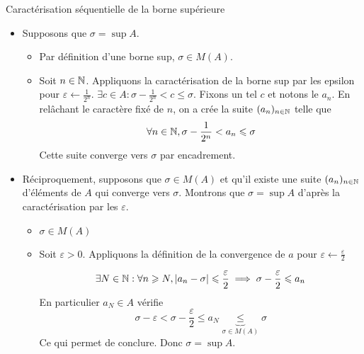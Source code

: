 \documentclass{article}
\begin{document}
\begin{question_kholle}[{Soit $A \in \mathcal{P}(\R)$ non vide et majorée. Soit $\sigma \in \R$
        $$
          \sigma = \sup A \iff \left\{ \begin{array}{ll}
            \sigma \in M(A) \\
            \exists (a_{n})_{n \in \N} \in A^{\N} : \lim_{n \to +\infty} a_n = \sigma
          \end{array}\right.
        $$
      }]{Caractérisation séquentielle de la borne supérieure}
  \hfill\\
  \begin{itemize}[label=$\star$]
    \item Supposons que $\sigma = \sup A$.
          \begin{itemize}[label=$\bullet$]
            \item Par définition d'une borne sup, $\sigma \in M(A)$.
            \item Soit $n \in \mathbb N$. Appliquons la caractérisation de la borne sup par les epsilon pour $\varepsilon \leftarrow \frac{1}{2^{n}}$.
                  $\exists c \in A : \sigma - \frac{1}{2^{n}} < c \leqslant \sigma$.
                  Fixons un tel $c$ et notons le $a_{n}$. En relâchant le caractère fixé de $n$, on a crée la suite $(a_{n})_{n \in \mathbb N}$ telle que
                  $$
                    \forall n \in \mathbb N, \sigma - \frac{1}{2^{n}} < a_{n}\leqslant \sigma
                  $$
                  Cette suite converge vers $\sigma$ par encadrement.
          \end{itemize}
    \item Réciproquement, supposons que $\sigma \in M(A)$ et qu'il existe une suite $(a_{n})_{n \in \mathbb N}$ d'éléments de $A$ qui converge vers $\sigma$. Montrons que $\sigma = \sup A$ d'après la caractérisation par les $\varepsilon$.
          \begin{itemize}[label=$\bullet$]
            \item$\sigma \in M(A)$
            \item Soit $\varepsilon>0$. Appliquons la définition de la convergence de $a$ pour $\varepsilon \leftarrow \frac{\varepsilon}{2}$

                  $$
                    \exists N \in \mathbb N : \forall n \geqslant N, \lvert a_{n} - \sigma \rvert  \leqslant \frac{\varepsilon}{2} \implies \sigma - \frac{\varepsilon}{2}\leqslant a_{n}
                  $$
                  En particulier $a_{N} \in A$ vérifie
                  $$
                    \sigma - \varepsilon < \sigma - \frac{\varepsilon}{2} \leqslant a_{N} \underbrace{ \leqslant }_{ \sigma \in M(A) } \sigma
                  $$
                  Ce qui permet de conclure.
                  Donc $\sigma = \sup A$.
          \end{itemize}
  \end{itemize}
\end{question_kholle}
\end{document}
